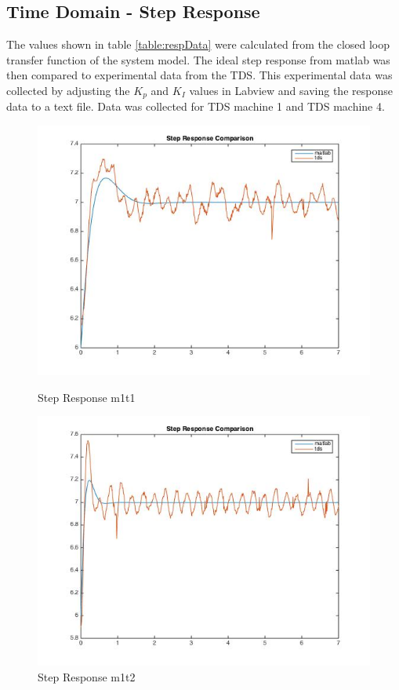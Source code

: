 \documentclass[11pt,titlepage]{article}
\begin{document}
    \subsection{Time Domain - Step Response} \label{sub:step}
    The values shown in table \ref{table:respData} were calculated from the closed loop transfer function of the system model. The ideal step response from matlab was then compared to experimental data from the TDS. This experimental data was collected by adjusting the $K_p$ and $K_I$ values in Labview and saving the response data to a text file. Data was collected for TDS machine 1 and TDS machine 4.
    \begin{figure}[H]
        \centering
        \begin{minipage}{.5\textwidth}
            \centering
            \includegraphics[scale=.3]{stepM1_T1}
            \caption{Step Response m1t1}
            \label{fig:stepM1_T1}
        \end{minipage}%
        \begin{minipage}{.5\textwidth}
            \centering
            \includegraphics[scale=.3]{stepM1_T2}
            \caption{Step Response m1t2}
            \label{fig:stepM1_T2}
        \end{minipage}%
    \end{figure}
\end{document}
